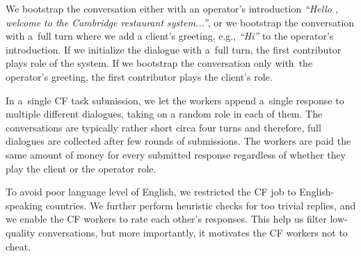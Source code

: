 \documentclass[runningheads,a4paper]{llncs}
\begin{document}
We bootstrap the conversation either with an operator's introduction {\it ``Hello , welcome to the Cambridge restaurant system...''}, or we bootstrap the conversation with a~full turn where we add a client's greeting, e.g., {\it ``Hi''} to the operator's introduction.
If we initialize the dialogue with a~full turn, the first contributor plays role of the system. If we bootstrap the conversation only with~the operator's greeting, the first contributor plays the client's role.

In a~single CF task submission, we let the workers append a~single response to multiple different dialogues, taking on a random role in each of them.
The conversations are typically rather short circa four turns and therefore, full dialogues are collected after few rounds of submissions.
The workers are paid  the same amount of money for every submitted response regardless of whether they play the client or the operator role.

To avoid poor language level of English, we restricted the CF job to English-speaking countries.
We further perform heuristic checks for too trivial replies, and we enable the CF workers to rate each other's responses.
This help us filter low-quality conversations, but more importantly, it motivates the CF workers not to cheat.
\end{document}
